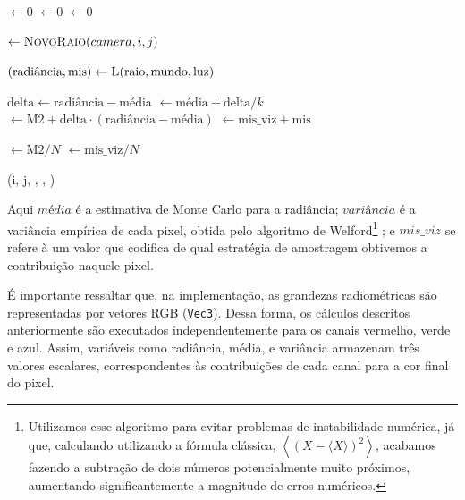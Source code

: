 \begin{algorithm}
\caption{Laço principal}
\label{alg:mainloop}
\begin{algorithmic}[1]


    \State {} $\gets 0$
    \State {} $\gets 0$
    \State {} $\gets 0$

        \State {} $\gets \Call{NovoRaio}{camera, i, j}$

        \State $(\text{radiância}, \text{mis}) \gets \Call{L}{\text{raio}, \text{mundo}, \text{luz}}$

        \State $\text{delta} \gets \text{radiância} - \text{média}$
        \State {} $\gets \text{média} + \text{delta} / k$
        \State {} $\gets \text{M2} + \text{delta} \cdot (\text{radiância} - \text{média})$
        \State {} $\gets \text{mis\_viz} + \text{mis}$

    \EndFor

    \State {} $\gets \text{M2} / N$
    \State {} $\gets \text{mis\_viz} / N$

    \State {}(i, j, , , )

\EndFor
\EndFor

\end{algorithmic}
\end{algorithm}

Aqui $média$ é a estimativa de Monte Carlo para a radiância; $variância$ é a
variância empírica de cada pixel, obtida pelo algoritmo de
Welford\footnote{Utilizamos esse algoritmo para evitar problemas de
instabilidade numérica, já que, calculando utilizando a fórmula clássica,
$\left\langle (X - \langle X \rangle)^2 \right\rangle$, acabamos fazendo a
subtração de dois números potencialmente muito próximos, aumentando
significantemente a magnitude de erros numéricos.} \citep{welford62}; e
$mis\_viz$ se refere à um valor que codifica de qual estratégia de amostragem
obtivemos a contribuição naquele pixel. 

É importante ressaltar que, na implementação, as grandezas radiométricas são
representadas por vetores RGB (\texttt{Vec3}). Dessa forma, os cálculos
descritos anteriormente são executados independentemente para os canais
vermelho, verde e azul. Assim, variáveis como radiância, média, e variância
armazenam três valores escalares, correspondentes às contribuições de cada
canal para a cor final do pixel.

